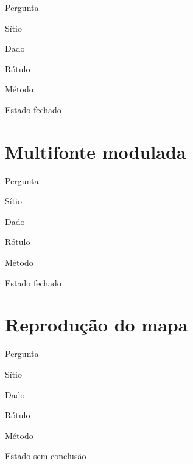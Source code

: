 \begin{ficha}
  \item[Pergunta] \lipsum[77][1]
  \item[Sítio]    \lipsum[78][2]
  \item[Dado]     \lipsum[79][3]
  \item[Rótulo]   \lipsum[80][1]
  \item[Método]   \lipsum[81][2]
  \item[Estado]   fechado
\end{ficha}

\lipsum[82][1-5]

\lipsum[83][1-4]

\conclusao{\lipsum[84][1-2]}

\begin{objecao}\lipsum[85][1-3]\end{objecao}


\section{Multifonte modulada}

\begin{ficha}
  \item[Pergunta] \lipsum[86][1]
  \item[Sítio]    \lipsum[87][2]
  \item[Dado]     \lipsum[88][3]
  \item[Rótulo]   \lipsum[89][1]
  \item[Método]   \lipsum[90][2]
  \item[Estado]   fechado
\end{ficha}

\lipsum[91][1-5]

\lipsum[92][1-4]

\conclusao{\lipsum[93][1-2]}

\begin{objecao}\lipsum[94][1-3]\end{objecao}


\section{Reprodução do mapa}

\begin{ficha}
  \item[Pergunta] \lipsum[95][1]
  \item[Sítio]    \lipsum[96][2]
  \item[Dado]     \lipsum[97][3]
  \item[Rótulo]   \lipsum[98][1]
  \item[Método]   \lipsum[99][2]
  \item[Estado]   sem conclusão
\end{ficha}

\lipsum[100][1-5]

\lipsum[101][1-4]

\conclusao{\lipsum[102][1-2]}

\begin{objecao}\lipsum[103][1-3]\end{objecao}

